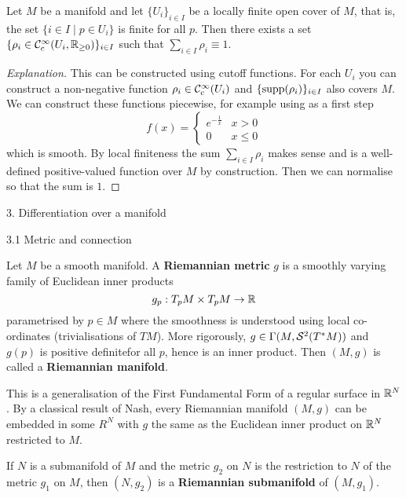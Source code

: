 \begin{prop}
  Let $M$ be a manifold and let $\{U_i\}_{i\in I}$ be a locally finite open cover of $M$, that is, the set $\{i\in I \mid p \in U_i\}$ is finite for all $p$.
  Then there exists a set $\{\rho_i\in\mathcal{C}_c^\infty(U_i,\mathbb{R}_{\geq0})\}_{i\in I}$ such that $\sum_{i\in I}\rho_i \equiv 1$.
\end{prop}

\begin{proof}[Explanation]
  This can be constructed using cutoff functions.
  For each $U_i$ you can construct a non-negative function $\rho_i\in\mathcal{C}_c^\infty(U_i)$ and $\{\operatorname{supp}(\rho_i)\}_{i\in I}$ also covers $M$.
  We can construct these functions piecewise, for example using as a first step
  \begin{equation*}
    f(x)=
    \begin{cases}
      e^{-\frac1x} & x>0 \\
      0 & x\leq0
    \end{cases}
  \end{equation*}
  which is smooth.
  By local finiteness the sum $\sum_{i\in I}\rho_i$ makes sense and is a well-defined positive-valued function over $M$ by construction.
  Then we can normalise so that the sum is $1$.
\end{proof}

3. Differentiation over a manifold

3.1 Metric and connection

\begin{defn}[3.1]
  Let $M$ be a smooth manifold.
  A \textbf{Riemannian metric} $g$ is a smoothly varying family of Euclidean inner products
  \[ g_p: T_pM \times T_pM \to \mathbb{R} \]
  parametrised by $p \in M$ where the smoothness is understood using local co-ordinates (trivialisations of $TM$).
  More rigorously, $g\in\Gamma(M,\mathcal{S}^2(T^*M))$ and $g(p)$ is positive definitefor all $p$, hence is an inner product.
  Then $(M,g)$ is called a \textbf{Riemannian manifold}.
\end{defn}

\begin{rmk}
  This is a generalisation of the First Fundamental Form of a regular surface in $\mathbb{R}^N$.
  By a classical result of Nash, every Riemannian manifold $(M,g)$ can be embedded in some $R^N$ with $g$ the same as the Euclidean inner product on $\mathbb{R}^N$ restricted to $M$.
\end{rmk}

\begin{defn}
  If $N$ is a submanifold of $M$ and the metric $g_2$ on $N$ is the restriction to $N$ of the metric $g_1$ on $M$, then $(N,g_2)$ is a \textbf{Riemannian submanifold} of $(M,g_1)$.
\end{defn}

